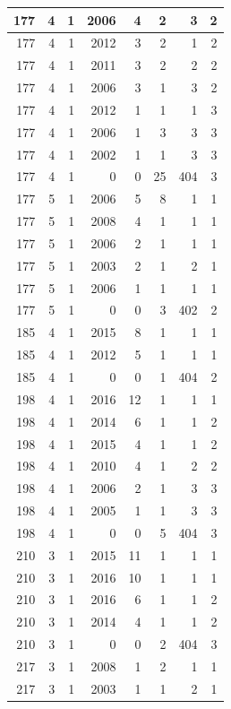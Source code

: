 \documentclass[11pt,]{book}
\begin{document}
\begin{table}
\begin{tabular}[t]{r|r|r|r|r|r|r|r}
\hline
177 & 4 & 1 & 2006 & 4 & 2 & 3 & 2\\
\hline
177 & 4 & 1 & 2012 & 3 & 2 & 1 & 2\\
\hline
177 & 4 & 1 & 2011 & 3 & 2 & 2 & 2\\
\hline
177 & 4 & 1 & 2006 & 3 & 1 & 3 & 2\\
\hline
177 & 4 & 1 & 2012 & 1 & 1 & 1 & 3\\
\hline
177 & 4 & 1 & 2006 & 1 & 3 & 3 & 3\\
\hline
177 & 4 & 1 & 2002 & 1 & 1 & 3 & 3\\
\hline
177 & 4 & 1 & 0 & 0 & 25 & 404 & 3\\
\hline
177 & 5 & 1 & 2006 & 5 & 8 & 1 & 1\\
\hline
177 & 5 & 1 & 2008 & 4 & 1 & 1 & 1\\
\hline
177 & 5 & 1 & 2006 & 2 & 1 & 1 & 1\\
\hline
177 & 5 & 1 & 2003 & 2 & 1 & 2 & 1\\
\hline
177 & 5 & 1 & 2006 & 1 & 1 & 1 & 1\\
\hline
177 & 5 & 1 & 0 & 0 & 3 & 402 & 2\\
\hline
185 & 4 & 1 & 2015 & 8 & 1 & 1 & 1\\
\hline
185 & 4 & 1 & 2012 & 5 & 1 & 1 & 1\\
\hline
185 & 4 & 1 & 0 & 0 & 1 & 404 & 2\\
\hline
198 & 4 & 1 & 2016 & 12 & 1 & 1 & 1\\
\hline
198 & 4 & 1 & 2014 & 6 & 1 & 1 & 2\\
\hline
198 & 4 & 1 & 2015 & 4 & 1 & 1 & 2\\
\hline
198 & 4 & 1 & 2010 & 4 & 1 & 2 & 2\\
\hline
198 & 4 & 1 & 2006 & 2 & 1 & 3 & 3\\
\hline
198 & 4 & 1 & 2005 & 1 & 1 & 3 & 3\\
\hline
198 & 4 & 1 & 0 & 0 & 5 & 404 & 3\\
\hline
210 & 3 & 1 & 2015 & 11 & 1 & 1 & 1\\
\hline
210 & 3 & 1 & 2016 & 10 & 1 & 1 & 1\\
\hline
210 & 3 & 1 & 2016 & 6 & 1 & 1 & 2\\
\hline
210 & 3 & 1 & 2014 & 4 & 1 & 1 & 2\\
\hline
210 & 3 & 1 & 0 & 0 & 2 & 404 & 3\\
\hline
217 & 3 & 1 & 2008 & 1 & 2 & 1 & 1\\
\hline
217 & 3 & 1 & 2003 & 1 & 1 & 2 & 1\\

\end{tabular}
\end{table}
\end{document}
